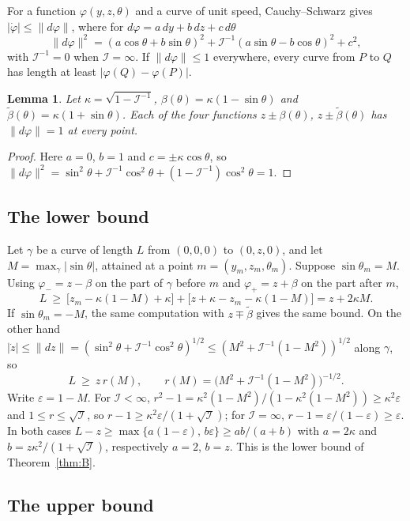 \documentclass[11pt]{amsart}
\newtheorem{lemma}[theorem]{Lemma}
\theoremstyle{definition}
\newcommand{\I}{\mathcal{I}}
\begin{document}
For a function $\varphi(y,z,\theta)$ and a curve of unit speed, Cauchy--Schwarz gives $|\dot\varphi|\le\|d\varphi\|$, where for $d\varphi=a\,dy+b\,dz+c\,d\theta$
\[
\|d\varphi\|^2=(a\cos\theta+b\sin\theta)^2+\I^{-1}(a\sin\theta-b\cos\theta)^2+c^2,
\]
with $\I^{-1}=0$ when $\I=\infty$. If $\|d\varphi\|\le1$ everywhere, every curve from $P$ to $Q$ has length at least $|\varphi(Q)-\varphi(P)|$.

\begin{lemma}\label{lem:calib}
Let $\kappa=\sqrt{1-\I^{-1}}$, $\beta(\theta)=\kappa(1-\sin\theta)$ and $\tilde\beta(\theta)=\kappa(1+\sin\theta)$. Each of the four functions $z\pm\beta(\theta)$, $z\pm\tilde\beta(\theta)$ has $\|d\varphi\|=1$ at every point.
\end{lemma}

\begin{proof}
Here $a=0$, $b=1$ and $c=\pm\kappa\cos\theta$, so $\|d\varphi\|^2=\sin^2\theta+\I^{-1}\cos^2\theta+(1-\I^{-1})\cos^2\theta=1$.
\end{proof}

\subsection{The lower bound}

Let $\gamma$ be a curve of length $L$ from $(0,0,0)$ to $(0,z,0)$, and let $M=\max_\gamma|\sin\theta|$, attained at a point $m=(y_m,z_m,\theta_m)$. Suppose $\sin\theta_m=M$. Using $\varphi_-=z-\beta$ on the part of $\gamma$ before $m$ and $\varphi_+=z+\beta$ on the part after $m$,
\[
L\ \ge\ \bigl[z_m-\kappa(1-M)+\kappa\bigr]+\bigl[z+\kappa-z_m-\kappa(1-M)\bigr]=z+2\kappa M .
\]
If $\sin\theta_m=-M$, the same computation with $z\mp\tilde\beta$ gives the same bound. On the other hand $|\dot z|\le\|dz\|=(\sin^2\theta+\I^{-1}\cos^2\theta)^{1/2}\le(M^2+\I^{-1}(1-M^2))^{1/2}$ along $\gamma$, so
\[
L\ \ge\ z\,r(M),\qquad r(M)=\bigl(M^2+\I^{-1}(1-M^2)\bigr)^{-1/2}.
\]
Write $\varepsilon=1-M$. For $\I<\infty$, $r^2-1=\kappa^2(1-M^2)/(1-\kappa^2(1-M^2))\ge\kappa^2\varepsilon$ and $1\le r\le\sqrt{\I}$, so $r-1\ge\kappa^2\varepsilon/(1+\sqrt{\I})$; for $\I=\infty$, $r-1=\varepsilon/(1-\varepsilon)\ge\varepsilon$. In both cases $L-z\ge\max\{a(1-\varepsilon),\,b\varepsilon\}\ge ab/(a+b)$ with $a=2\kappa$ and $b=z\kappa^2/(1+\sqrt{\I})$, respectively $a=2$, $b=z$. This is the lower bound of Theorem~\ref{thm:B}.

\subsection{The upper bound}
\end{document}

